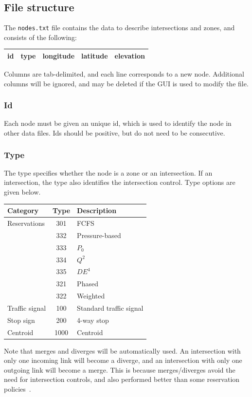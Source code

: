 \subsection{File structure}
The \texttt{nodes.txt} file contains the data to describe intersections and zones, and consists of the following:
\begin{center}
\begin{tabular}{ccccc}
\hline
id & type & longitude & latitude  & elevation \\\hline
\end{tabular}
\end{center}
Columns are tab-delimited, and each line corresponds to a new node. Additional columns will be ignored, and may be deleted if the GUI is used to modify the file.

\subsubsection*{Id}
Each node must be given an unique id, which is used to identify the node in other data files. Ids should be positive, but do not need to be consecutive.

\subsubsection*{Type}
The type specifies whether the node is a zone or an intersection. If an intersection, the type also identifies the intersection control. Type options are given below.
\begin{center}
\begin{tabular}{lcl}
\hline
Category & Type & Description\\\hline
Reservations & 301 & FCFS\\
& 332 & Pressure-based\\
& 333 & $P_0$\\
& 334 & $Q^2$~\cite{levin2015optimizing}\\
& 335 & $DE^4$~\cite{levin2015optimizing}\\
& 321 & {\sc Phased}\\
& 322 & {\sc Weighted}\\\hline
Traffic signal & 100 & Standard traffic signal\\\hline
Stop sign & 200 & 4-way stop \\\hline
Centroid & 1000 & Centroid\\\hline
\end{tabular}
\end{center}
Note that merges and diverges will be automatically used. An intersection with only one incoming link will become a diverge, and an intersection with only one outgoing link will become a merge. This is because merges/diverges avoid the need for intersection controls, and also performed better than some reservation policies~\cite{levin2016paradoxes}.

